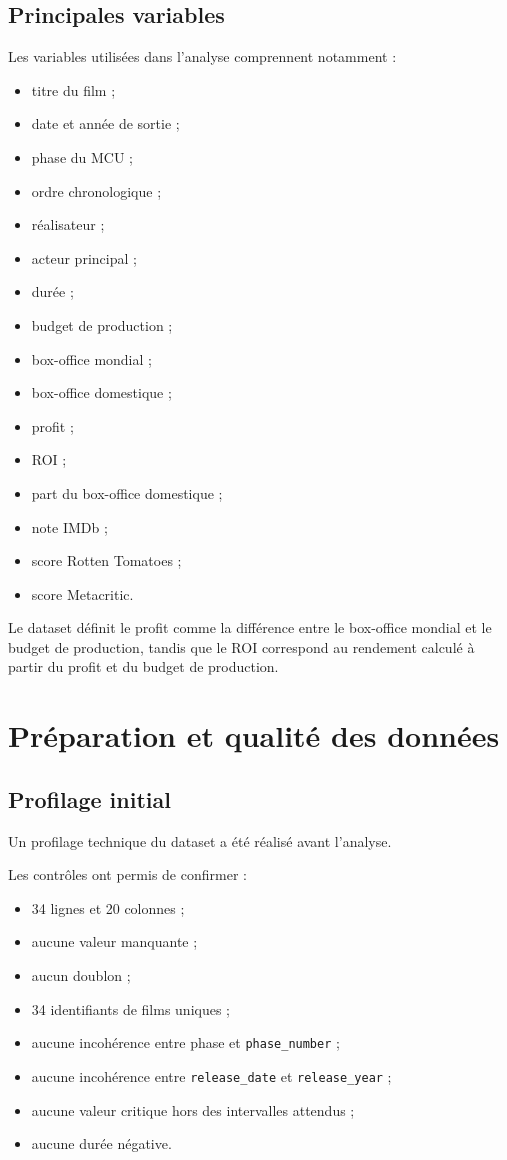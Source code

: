\documentclass[a4paper,11pt]{article}
\newcommand{\varname}[1]{\texttt{#1}}
\begin{document}
\subsection{Principales variables}

Les variables utilisées dans l'analyse comprennent notamment :
\begin{itemize}
  \item titre du film ;
  \item date et année de sortie ;
  \item phase du MCU ;
  \item ordre chronologique ;
  \item réalisateur ;
  \item acteur principal ;
  \item durée ;
  \item budget de production ;
  \item box-office mondial ;
  \item box-office domestique ;
  \item profit ;
  \item ROI ;
  \item part du box-office domestique ;
  \item note IMDb ;
  \item score Rotten Tomatoes ;
  \item score Metacritic.
\end{itemize}

Le dataset définit le profit comme la différence entre le box-office mondial
et le budget de production, tandis que le ROI correspond au rendement calculé
à partir du profit et du budget de production.

\section{Préparation et qualité des données}

\subsection{Profilage initial}

Un profilage technique du dataset a été réalisé avant l'analyse.

Les contrôles ont permis de confirmer :
\begin{itemize}
  \item 34 lignes et 20 colonnes ;
  \item aucune valeur manquante ;
  \item aucun doublon ;
  \item 34 identifiants de films uniques ;
  \item aucune incohérence entre phase et \varname{phase\_number} ;
  \item aucune incohérence entre \varname{release\_date} et
        \varname{release\_year} ;
  \item aucune valeur critique hors des intervalles attendus ;
  \item aucune durée négative.
\end{itemize}
\end{document}

